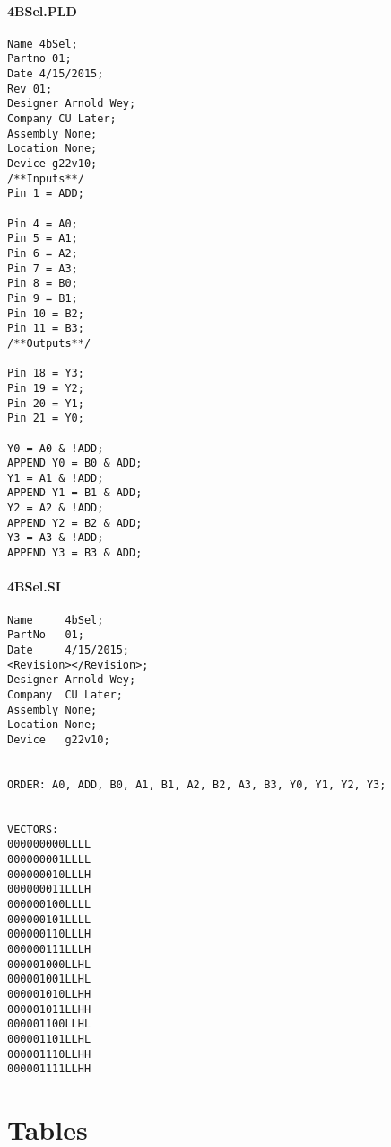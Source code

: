 \documentclass[letterpaper,titlepage,oneside]{article}
\begin{document}
\pagebreak
\paragraph*{4BSel.PLD}
\label{code: 4BSel}
\begin{lstlisting}
Name 4bSel;
Partno 01;
Date 4/15/2015;
Rev 01;
Designer Arnold Wey;
Company CU Later;
Assembly None;
Location None;
Device g22v10;
/**Inputs**/
Pin 1 = ADD;

Pin 4 = A0;
Pin 5 = A1;
Pin 6 = A2;
Pin 7 = A3;
Pin 8 = B0;
Pin 9 = B1;
Pin 10 = B2;
Pin 11 = B3;
/**Outputs**/

Pin 18 = Y3;
Pin 19 = Y2;
Pin 20 = Y1;
Pin 21 = Y0;

Y0 = A0 & !ADD;
APPEND Y0 = B0 & ADD;
Y1 = A1 & !ADD;
APPEND Y1 = B1 & ADD;
Y2 = A2 & !ADD;
APPEND Y2 = B2 & ADD;
Y3 = A3 & !ADD;
APPEND Y3 = B3 & ADD;

\end{lstlisting}
\pagebreak
\paragraph*{4BSel.SI}
\label{code: 4BSelSi}
\begin{lstlisting}
Name     4bSel;
PartNo   01;
Date     4/15/2015;
<Revision></Revision>;
Designer Arnold Wey;
Company  CU Later;
Assembly None;
Location None;
Device   g22v10;


ORDER: A0, ADD, B0, A1, B1, A2, B2, A3, B3, Y0, Y1, Y2, Y3; 


VECTORS:
000000000LLLL
000000001LLLL
000000010LLLH
000000011LLLH
000000100LLLL
000000101LLLL
000000110LLLH
000000111LLLH
000001000LLHL
000001001LLHL
000001010LLHH
000001011LLHH
000001100LLHL
000001101LLHL
000001110LLHH
000001111LLHH
\end{lstlisting}


\clearpage
\section{Tables}
\end{document}
